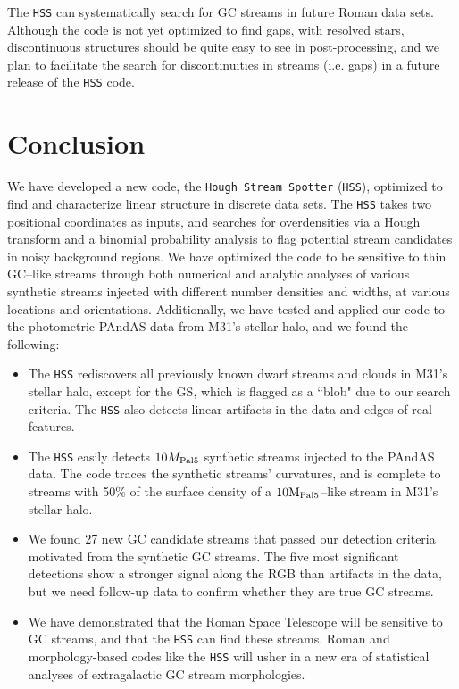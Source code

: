 \documentclass[twocolumn]{aastex631}
\begin{document}
The \texttt{HSS} can systematically search for GC streams in future Roman data sets. Although the code is not yet optimized to find gaps, with resolved stars, discontinuous structures should be quite easy to see in post-processing, and we plan to facilitate the search for discontinuities in streams (i.e. gaps) in a future release of the \texttt{HSS} code. 




\section{Conclusion}\label{sec:conclusion}
We have developed a new code, the \texttt{Hough Stream Spotter} (\texttt{HSS}), optimized to find and characterize linear structure in discrete data sets. The \texttt{HSS} takes two positional coordinates as inputs, and searches for overdensities via a Hough transform and a binomial probability analysis to flag potential stream candidates in noisy background regions. We have optimized the code to be sensitive to thin GC--like streams through both numerical and analytic analyses of various synthetic streams injected with different number densities and widths, at various locations and orientations. Additionally, we have tested and applied our code to the photometric PAndAS data from M31's stellar halo, and we found the following:

 

\begin{itemize}

    \item The \texttt{HSS} rediscovers all previously known dwarf streams and clouds in M31's stellar halo, except for the GS, which is flagged as a ``blob" due to our search criteria. The \texttt{HSS} also detects linear artifacts in the data and edges of real features. 
    
    \item The \texttt{HSS} easily detects $10{M}_{\rm Pal 5}$ synthetic streams injected to the PAndAS data. The code traces the synthetic streams' curvatures, and is complete to streams with 50\% of the surface density of a $10 {\rm M}_{\rm Pal 5}$--like stream in M31's stellar halo.
    
    \item We found 27 new GC candidate streams that passed our detection criteria motivated from the synthetic GC streams. The five most significant detections show a stronger signal along the RGB than artifacts in the data, but we need follow-up data to confirm whether they are true GC streams. 
    
    \item We have demonstrated that the Roman Space Telescope will be sensitive to GC streams, and that the \texttt{HSS} can find these streams. Roman and morphology-based codes like the \texttt{HSS} will usher in a new era of statistical analyses of extragalactic GC stream morphologies. 
    

\end{itemize}
\end{document}
